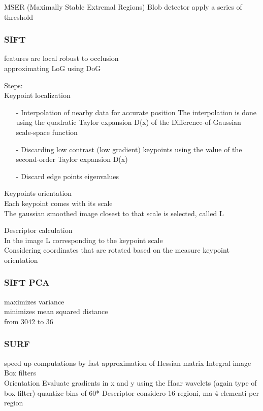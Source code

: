 \documentclass[11pt,english]{article}
\begin{document}
MSER (Maximally Stable Extremal Regions) \makebox[0.5cm]{\textrightarrow} Blob detector \makebox[0.5cm]{\textrightarrow} apply a series of threshold 

\subsubsection*{SIFT}
features are local \makebox[0.5cm]{\textrightarrow} robust to occlusion \\
approximating LoG using DoG

\medskip

Steps: \\
Keypoint localization
\begin{itemize}
    \item[-] Interpolation of nearby data for accurate position \makebox[0.5cm]{\textrightarrow} The interpolation is done using the 
		quadratic Taylor expansion D(x) of the Difference-of-Gaussian scale-space function
    \item[-] Discarding low contrast (low gradient) keypoints \makebox[0.5cm]{\textrightarrow} using the value of the second-order Taylor expansion D(x)
    \item[-] Discard edge points \makebox[0.5cm]{\textrightarrow} eigenvalues 
\end{itemize}
\medskip
Keypoints orientation \\

Each keypoint comes with its scale \\
The gaussian smoothed image closest to that scale is selected, called L

\medskip

Descriptor calculation \\
In the image L corresponding to the keypoint scale \\
Considering coordinates that are rotated based on the measure keypoint orientation

\subsubsection*{SIFT PCA}
maximizes variance \\
minimizes mean squared distance \\
from 3042 to 36

\subsubsection*{SURF}
speed up computations by fast approximation of Hessian matrix \makebox[0.5cm]{\textrightarrow} Integral image \makebox[0.5cm]{\textrightarrow} Box filters \\
Orientation \makebox[0.5cm]{\textrightarrow} Evaluate gradients in x and y using the Haar wavelets (again type of box filter) 
	    \makebox[0.5cm]{\textrightarrow} quantize bins of 60*
Descriptor \makebox[0.5cm]{\textrightarrow} considero 16 regioni, ma 4 elementi per region 
\end{document}
